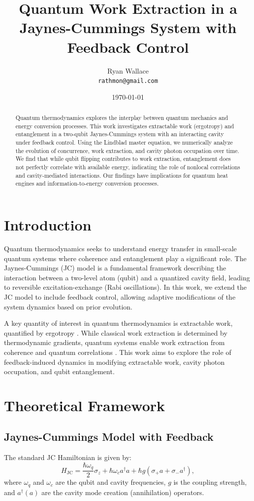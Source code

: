 \documentclass[a4paper,12pt]{article}
\title{Quantum Work Extraction in a Jaynes-Cummings System with Feedback Control}
\author{Ryan Wallace \\ \texttt{rathmon@gmail.com}}
\date{\today}
\begin{document}
\maketitle

\begin{abstract}
Quantum thermodynamics explores the interplay between quantum mechanics and energy conversion processes. 
This work investigates extractable work (ergotropy) and entanglement in a two-qubit Jaynes-Cummings system 
with an interacting cavity under feedback control. Using the Lindblad master equation, we numerically analyze 
the evolution of concurrence, work extraction, and cavity photon occupation over time. We find that while qubit 
flipping contributes to work extraction, entanglement does not perfectly correlate with available energy, indicating 
the role of nonlocal correlations and cavity-mediated interactions. Our findings have implications for quantum heat 
engines and information-to-energy conversion processes.
\end{abstract}

\section{Introduction}
Quantum thermodynamics seeks to understand energy transfer in small-scale quantum systems where coherence and entanglement 
play a significant role. The Jaynes-Cummings (JC) model \cite{jaynes1963comparison} is a fundamental framework describing 
the interaction between a two-level atom (qubit) and a quantized cavity field, leading to reversible excitation-exchange 
(Rabi oscillations). In this work, we extend the JC model to include feedback control, allowing adaptive modifications 
of the system dynamics based on prior evolution.

A key quantity of interest in quantum thermodynamics is extractable work, quantified by ergotropy \cite{allahverdyan2004maximal}. 
While classical work extraction is determined by thermodynamic gradients, quantum systems enable work extraction from coherence 
and quantum correlations \cite{vinjanampathy2016quantum}. This work aims to explore the role of feedback-induced dynamics in 
modifying extractable work, cavity photon occupation, and qubit entanglement.

\section{Theoretical Framework}

\subsection{Jaynes-Cummings Model with Feedback}
The standard JC Hamiltonian is given by:
\begin{equation}
H_{\text{JC}} = \frac{\hbar \omega_q}{2} \sigma_z + \hbar \omega_c a^\dagger a + \hbar g (\sigma_+ a + \sigma_- a^\dagger),
\end{equation}
where $\omega_q$ and $\omega_c$ are the qubit and cavity frequencies, $g$ is the coupling strength, and 
$a^\dagger (a)$ are the cavity mode creation (annihilation) operators.
\end{document}
